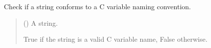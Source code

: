 \documentclass[letterpaper,12pt,english]{sphinxmanual}
\begin{document}
\begin{fulllineitems}
\label{\detokenize{api/core:cbmpy.CBCommon.checkId}}
\pysigstartsignatures
\pysiglinewithargsret
{}
{}
{}
\pysigstopsignatures
\sphinxAtStartPar
Check if a string conforms to a C variable naming convention.
\begin{quote}\begin{description}
\sphinxAtStartPar
{} () \textendash{} A string.

\sphinxAtStartPar
{} \textendash{} True if the string is a valid C variable name, False otherwise.

\end{description}\end{quote}

\end{fulllineitems}

\end{document}
